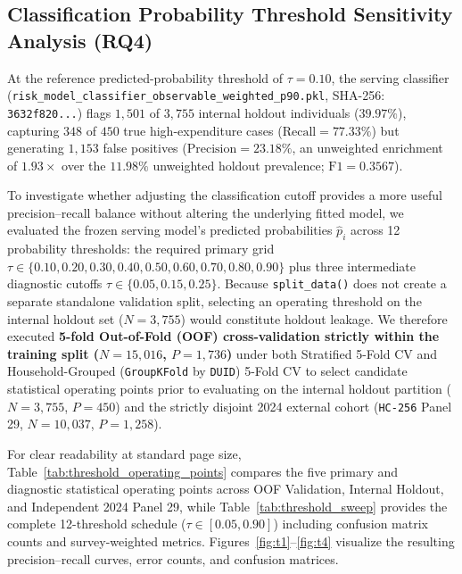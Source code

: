 \documentclass[runningheads]{llncs}
\begin{document}
\subsection{Classification Probability Threshold Sensitivity Analysis (RQ4)}
At the reference predicted-probability threshold of $\tau = 0.10$, the serving classifier (\texttt{risk\_model\_classifier\_observable\_weighted\_p90.pkl}, SHA-256: \texttt{3632f820...}) flags $1,501$ of $3,755$ internal holdout individuals ($39.97\%$), capturing $348$ of $450$ true high-expenditure cases ($\text{Recall} = 77.33\%$) but generating $1,153$ false positives ($\text{Precision} = 23.18\%$, an unweighted enrichment of $1.93\times$ over the $11.98\%$ unweighted holdout prevalence; $\text{F1} = 0.3567$).

To investigate whether adjusting the classification cutoff provides a more useful precision--recall balance without altering the underlying fitted model, we evaluated the frozen serving model's predicted probabilities $\hat{p}_i$ across 12 probability thresholds: the required primary grid $\tau \in \{0.10, 0.20, 0.30, 0.40, 0.50, 0.60, 0.70, 0.80, 0.90\}$ plus three intermediate diagnostic cutoffs $\tau \in \{0.05, 0.15, 0.25\}$. Because \texttt{split\_data()} does not create a separate standalone validation split, selecting an operating threshold on the internal holdout set ($N=3,755$) would constitute holdout leakage. We therefore executed \textbf{5-fold Out-of-Fold (OOF) cross-validation strictly within the training split ($N=15,016$, $P=1,736$)} under both Stratified 5-Fold CV and Household-Grouped (\texttt{GroupKFold} by \texttt{DUID}) 5-Fold CV to select candidate statistical operating points prior to evaluating on the internal holdout partition ($N=3,755$, $P=450$) and the strictly disjoint 2024 external cohort (\texttt{HC-256} Panel 29, $N=10,037$, $P=1,258$).

For clear readability at standard page size, Table~\ref{tab:threshold_operating_points} compares the five primary and diagnostic statistical operating points across OOF Validation, Internal Holdout, and Independent 2024 Panel 29, while Table~\ref{tab:threshold_sweep} provides the complete 12-threshold schedule ($\tau \in [0.05, 0.90]$) including confusion matrix counts and survey-weighted metrics. Figures~\ref{fig:t1}--\ref{fig:t4} visualize the resulting precision--recall curves, error counts, and confusion matrices.
\end{document}
